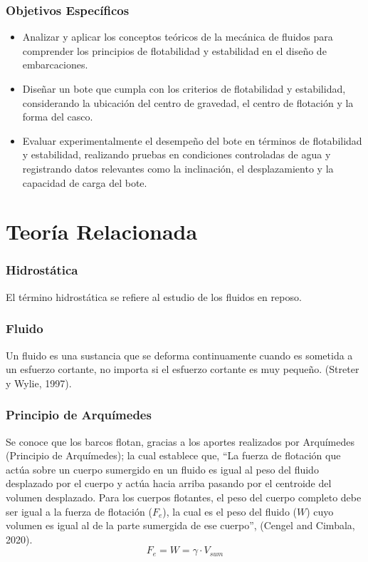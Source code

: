 \documentclass[letterpaper]{article}
\begin{document}
\subsubsection{Objetivos Específicos}
\begin{itemize}
	\item Analizar y aplicar los conceptos teóricos de la mecánica de fluidos para comprender los principios de flotabilidad y estabilidad en el diseño de embarcaciones.
	\item Diseñar un bote que cumpla con los criterios de flotabilidad y estabilidad, considerando la ubicación del centro de gravedad, el centro de flotación y la forma del casco.
	\item Evaluar experimentalmente el desempeño del bote en términos de flotabilidad y estabilidad, realizando pruebas en condiciones controladas de agua y registrando datos relevantes como la inclinación, el desplazamiento y la capacidad de carga del bote.
\end{itemize}
\newpage

\section{Teoría Relacionada}
\subsubsection{Hidrostática}
\setlength{\parindent}{18pt}

El término hidrostática se refiere al estudio de los fluidos en reposo.

\subsubsection{Fluido}
\setlength{\parindent}{18pt}
Un fluido es una sustancia que se deforma continuamente cuando es sometida 
a un esfuerzo cortante, no importa si el esfuerzo cortante es muy pequeño. (Streter y Wylie, 1997). 

\subsubsection{Principio de Arquímedes}
\setlength{\parindent}{18pt}
Se conoce que los barcos flotan, gracias a los aportes realizados por Arquímedes (Principio de Arquímedes);
la cual establece que, ``La fuerza de flotación que actúa sobre un cuerpo sumergido en un fluido es igual
al peso del fluido desplazado por el cuerpo y actúa hacia arriba pasando por el
centroide del volumen desplazado. Para los cuerpos flotantes, el peso del cuerpo completo debe ser igual a la fuerza
de flotación ($F_{e}$), la cual es el peso del fluido ($W$) cuyo volumen es igual al de la parte sumergida
de ese cuerpo'', (Cengel and Cimbala, 2020). 
\begin{equation}
	F_{e}= W = \gamma \cdot  V_{sum} 
\end{equation}
\end{document}
